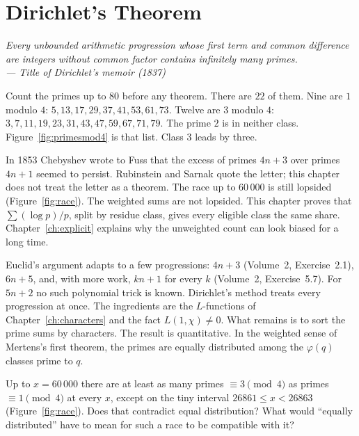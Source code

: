 \chapter{Dirichlet's Theorem}\label{ch:dirichlet}

\begin{center}\itshape
Every unbounded arithmetic progression whose first term and common difference are integers without common factor
contains infinitely many primes.\\
\upshape --- Title of Dirichlet's memoir (1837)
\end{center}

Count the primes up to $80$ before any theorem. There are $22$ of them. Nine are $1$ modulo $4$: $5,13,17,29,37,41,53,61,73$. Twelve are $3$ modulo $4$: $3,7,11,19,23,31,43,47,59,67,71,79$. The prime $2$ is in neither class. Figure~\ref{fig:primesmod4} is that list. Class $3$ leads by three.


In 1853 Chebyshev wrote to Fuss that the excess of primes $4n+3$ over primes $4n+1$ seemed to persist. Rubinstein and Sarnak quote the letter; this chapter does not treat the letter as a theorem. The race up to $60\,000$ is still lopsided (Figure~\ref{fig:race}). The weighted sums are not lopsided. This chapter proves that $\sum(\log p)/p$, split by residue class, gives every eligible class the same share. Chapter~\ref{ch:explicit} explains why the unweighted count can look biased for a long time.

Euclid's argument adapts to a few progressions: $4n+3$ (Volume~2, Exercise~2.1), $6n+5$, and, with more work, $kn+1$ for every $k$ (Volume~2, Exercise~5.7). For $5n+2$ no such polynomial trick is known. Dirichlet's method treats every progression at once. The ingredients are the $L$-functions of Chapter~\ref{ch:characters} and the fact $L(1,\chi)\ne0$. What remains is to sort the prime sums by characters. The result is quantitative. In the weighted sense of Mertens's first theorem, the primes are equally distributed among the $\varphi(q)$ classes prime to $q$.

\begin{think}
Up to $x=60\,000$ there are at least as many primes $\equiv3\pmod4$ as primes $\equiv1\pmod4$ at every $x$, except on the tiny interval $26861\le x<26863$ (Figure~\ref{fig:race}). Does that
contradict equal distribution? What would ``equally distributed'' have to mean for such a race to be compatible with it?
\end{think}

